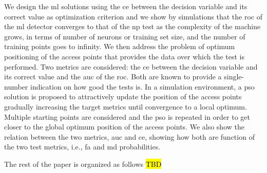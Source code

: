 \documentclass[twocolumns]{IEEEtran}
\begin{document}
We design the \ac{ml} solutions using the \ac{ce} between the decision variable and its correct value as optimization criterion and we show by simulations that the \ac{roc} of the \ac{ml} detector converges to that of the \ac{np} test as the complexity of the machine grows, in terms of number of neurons or training set size, and the number of training points goes to infinity. We then address the problem of optimum positioning of the access points that provides the data over which the test is performed. Two metrics are considered: the \ac{ce} between the decision variable and its correct value and the \ac{auc} of the \ac{roc}. Both are known to provide a single-number indication on how good the tests is. In a simulation environment, a \ac{pso} solution is proposed to attractively update the position of the access points gradually increasing the target metrics until convergence to a local optimum. Multiple starting points are considered and the \ac{pso} is repeated in order to get closer to the global optimum position of the access points. We also show the relation between the two metrics, \ac{auc} and \ac{ce}, showing how both are function of the two test metrics, i.e., \ac{fa} and \ac{md} probabilities.

The rest of the paper is organized as follows \hl{TBD}

 
\end{document}

